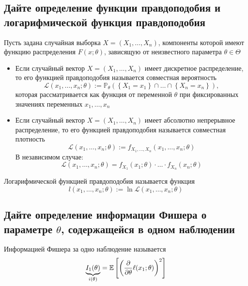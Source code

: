 \documentclass{article}
\begin{document}
\subsection{Дайте определение функции правдоподобия и логарифмической функция правдоподобия}
 Пусть задана случайная выборка $X=\left(X_{1}, \ldots, X_{n}\right)$, компоненты которой имеют функцию распределения $F(x; \theta)$, зависящую от неизвестного параметра $\theta \in \Theta$
\begin{itemize}
    \item Если случайный вектор $X=\left(X_{1}, \ldots, X_{n}\right)$ имеет дискретное распределение, то его функцией правдоподобия называется совместная вероятность
    \begin{equation*}
        \mathcal{L}\left(x_{1}, \ldots, x_{n} ; \theta\right):=\mathbb{P}_{\theta}\left(\left\{X_{1}=x_{1}\right\} \cap \ldots \cap\left\{X_{n}=x_{n}\right\}\right),
    \end{equation*}
    которая рассматривается как функция от переменной $\theta$ при фиксированных значениях переменных $x_1,\ldots,x_n$

    \item  Если случайный вектор $X=\left(X_{1}, \ldots, X_{n}\right)$ имеет абсолютно непрерывное распределение, то его функцией правдоподобия называется совместная плотность
    \begin{equation*}
        \mathcal{L}\left(x_{1}, \ldots, x_{n} ; \theta\right):=f_{X_{1}, \ldots, X_{n}}\left(x_{1}, \ldots, x_{n} ; \theta\right)
    \end{equation*}
    В независимом случае:
    \begin{equation*}
        \mathcal{L}\left(x_{1}, \ldots, x_{n} ; \theta\right)=f_{X_{1}}\left(x_{1} ; \theta\right) \cdot \ldots \cdot f_{X_{n}}\left(x_{n} ; \theta\right)
    \end{equation*}
\end{itemize}

 Логарифмической функцией правдоподобия называется функция
\begin{equation*}
    l\left(x_{1}, \ldots, x_{n} ; \theta\right):=\ln \mathcal{L}\left(x_{1}, \ldots, x_{n} ; \theta\right)
\end{equation*}

\subsection{Дайте определение информации Фишера о параметре $\theta$, содержащейся в одном наблюдении}
 Информацией Фишера за одно наблюдение называется
\begin{equation*}
    \underbrace{I_1(\theta)}_{i(\theta)}=\mathbb{E}\left[\left(\frac{\partial}{\partial\theta}\ell(x_1;\theta)\right)^2\right]
\end{equation*}
\end{document}
